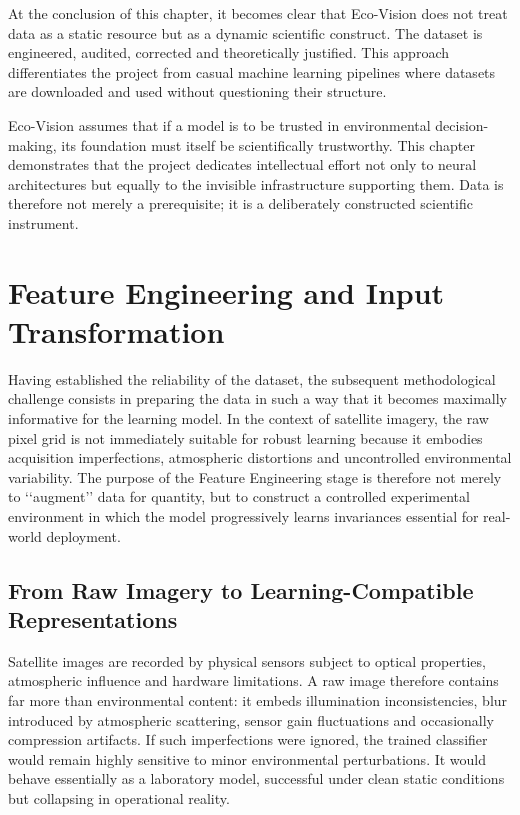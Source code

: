 \documentclass[12pt,a4paper]{report}
\begin{document}
At the conclusion of this chapter, it becomes clear that Eco-Vision does not treat data as a static resource but as a dynamic scientific construct. The dataset is engineered, audited, corrected and theoretically justified. This approach differentiates the project from casual machine learning pipelines where datasets are downloaded and used without questioning their structure.

Eco-Vision assumes that if a model is to be trusted in environmental decision-making, its foundation must itself be scientifically trustworthy. This chapter demonstrates that the project dedicates intellectual effort not only to neural architectures but equally to the invisible infrastructure supporting them. Data is therefore not merely a prerequisite; it is a deliberately constructed scientific instrument.

\newpage

\chapter{Feature Engineering and Input Transformation}

Having established the reliability of the dataset, the subsequent methodological challenge consists in preparing the data in such a way that it becomes maximally informative for the learning model. In the context of satellite imagery, the raw pixel grid is not immediately suitable for robust learning because it embodies acquisition imperfections, atmospheric distortions and uncontrolled environmental variability. The purpose of the Feature Engineering stage is therefore not merely to ‘‘augment’’ data for quantity, but to construct a controlled experimental environment in which the model progressively learns invariances essential for real-world deployment.

\section{From Raw Imagery to Learning-Compatible Representations}

Satellite images are recorded by physical sensors subject to optical properties, atmospheric influence and hardware limitations. A raw image therefore contains far more than environmental content: it embeds illumination inconsistencies, blur introduced by atmospheric scattering, sensor gain fluctuations and occasionally compression artifacts. If such imperfections were ignored, the trained classifier would remain highly sensitive to minor environmental perturbations. It would behave essentially as a laboratory model, successful under clean static conditions but collapsing in operational reality.
\end{document}
